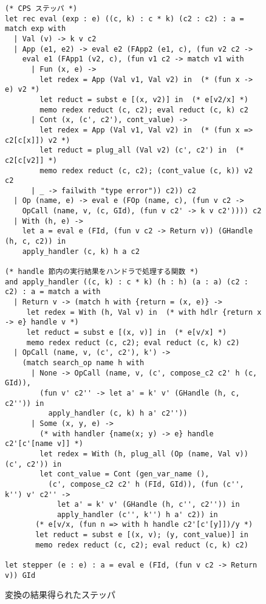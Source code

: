 
\begin{figure}
\begin{verbatim}
(* CPS ステッパ *)
let rec eval (exp : e) ((c, k) : c * k) (c2 : c2) : a = match exp with
  | Val (v) -> k v c2
  | App (e1, e2) -> eval e2 (FApp2 (e1, c), (fun v2 c2 ->
    eval e1 (FApp1 (v2, c), (fun v1 c2 -> match v1 with
      | Fun (x, e) ->
        let redex = App (Val v1, Val v2) in  (* (fun x -> e) v2 *)
        let reduct = subst e [(x, v2)] in  (* e[v2/x] *)
        memo redex reduct (c, c2); eval reduct (c, k) c2
      | Cont (x, (c', c2'), cont_value) ->
        let redex = App (Val v1, Val v2) in  (* (fun x => c2[c[x]]) v2 *)
        let reduct = plug_all (Val v2) (c', c2') in  (* c2[c[v2]] *)
        memo redex reduct (c, c2); (cont_value (c, k)) v2 c2
      | _ -> failwith "type error")) c2)) c2
  | Op (name, e) -> eval e (FOp (name, c), (fun v c2 ->
    OpCall (name, v, (c, GId), (fun v c2' -> k v c2')))) c2
  | With (h, e) ->
    let a = eval e (FId, (fun v c2 -> Return v)) (GHandle (h, c, c2)) in
    apply_handler (c, k) h a c2

(* handle 節内の実行結果をハンドラで処理する関数 *)
and apply_handler ((c, k) : c * k) (h : h) (a : a) (c2 : c2) : a = match a with
  | Return v -> (match h with {return = (x, e)} ->
     let redex = With (h, Val v) in  (* with hdlr {return x -> e} handle v *)
     let reduct = subst e [(x, v)] in  (* e[v/x] *)
     memo redex reduct (c, c2); eval reduct (c, k) c2)
  | OpCall (name, v, (c', c2'), k') ->
    (match search_op name h with
      | None -> OpCall (name, v, (c', compose_c2 c2' h (c, GId)),
        (fun v' c2'' -> let a' = k' v' (GHandle (h, c, c2'')) in
          apply_handler (c, k) h a' c2''))
      | Some (x, y, e) ->
        (* with handler {name(x; y) -> e} handle c2'[c'[name v]] *)
        let redex = With (h, plug_all (Op (name, Val v)) (c', c2')) in
        let cont_value = Cont (gen_var_name (),
          (c', compose_c2 c2' h (FId, GId)), (fun (c'', k'') v' c2'' ->
            let a' = k' v' (GHandle (h, c'', c2'')) in
            apply_handler (c'', k'') h a' c2)) in
       (* e[v/x, (fun n => with h handle c2'[c'[y]])/y *)
       let reduct = subst e [(x, v); (y, cont_value)] in
       memo redex reduct (c, c2); eval reduct (c, k) c2)

let stepper (e : e) : a = eval e (FId, (fun v c2 -> Return v)) GId
\end{verbatim}
\caption{変換の結果得られたステッパ}
\label{figure:6cps}
\end{figure}

